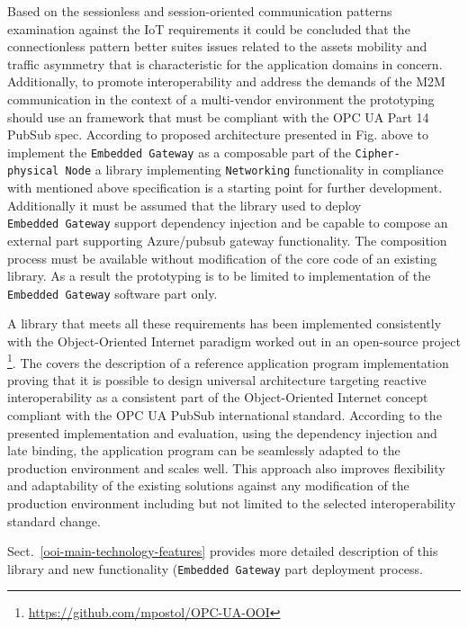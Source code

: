 \documentclass{jacsart}
\begin{document}
Based on the sessionless and session-oriented communication patterns
examination against the IoT requirements  \cite{mpostol2020} 
it could be
concluded that the connectionless pattern better suites issues related
to the assets mobility and traffic asymmetry that is characteristic for
the application domains in concern. Additionally, to promote
interoperability and address the demands of the M2M communication in the
context of a multi-vendor environment the prototyping should use an
framework that must be compliant with the OPC UA Part 14 PubSub spec.
According to proposed architecture presented in Fig. above to implement
the \texttt{Embedded\ Gateway} as a composable part of the
\texttt{Cipher-physical\ Node} a library implementing
\texttt{Networking} functionality in compliance with mentioned above
specification is a starting point for further development. Additionally
it must be assumed that the library used to deploy
\texttt{Embedded\ Gateway} support dependency injection and be capable
to compose an external part supporting Azure/pubsub gateway
functionality. The composition process must be available without
modification of the core code of an existing library. As a result the
prototyping is to be limited to implementation of the
\texttt{Embedded\ Gateway} software part only.

A library that meets all these requirements has been implemented consistently with the Object-Oriented Internet paradigm \cite{RefWorks:doc:5c66740ae4b081adf5804596} 
worked out in an open-source project \footnote{ \url{https://github.com/mpostol/OPC-UA-OOI} }. The \cite{mpostol2020} 
covers the description of a reference application program implementation proving that it is possible to design
universal architecture targeting reactive interoperability as a
consistent part of the Object-Oriented Internet concept compliant with
the OPC UA PubSub \cite{RefWorks:doc:5d98837de4b055984c0eecf0} international standard. According to the presented implementation and
evaluation, using the dependency injection and late binding, the
application program can be seamlessly adapted to the production
environment and scales well. This approach also improves flexibility and
adaptability of the existing solutions against any modification of the
production environment including but not limited to the selected
interoperability standard change.

Sect.~\ref*{ooi-main-technology-features} provides more detailed description of this library and new functionality (\texttt{Embedded\ Gateway}  part deployment process.
\end{document}
